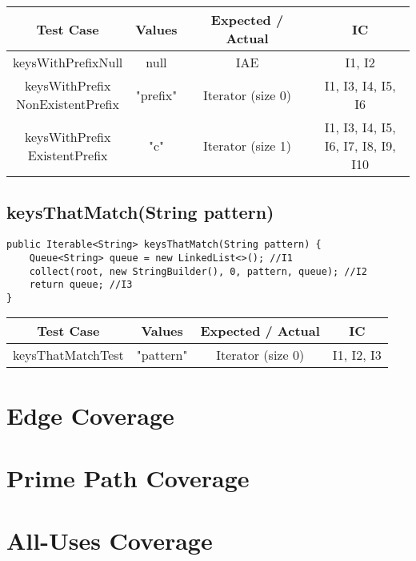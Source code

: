 \documentclass[12pt]{article}
\begin{document}
\begin{table}[htb]
\centering
\begin{tabular}{| c | c | c | c |} 
 \hline
 Test Case & Values & Expected / Actual & IC\\ \hline
 keysWithPrefixNull & null & IAE & I1, I2 \\ \hline
 \makecell{keysWithPrefix\\NonExistentPrefix} & "prefix" & Iterator (size 0) & I1, I3, I4, I5, I6 \\ \hline
 \makecell{keysWithPrefix\\ExistentPrefix} & "c" & Iterator (size 1) & \makecell{I1, I3, I4, I5, \\ I6, I7, I8, I9, I10} \\ \hline
\end{tabular}
\end{table}


\subsection{keysThatMatch(String pattern)}
\begin{lstlisting}
public Iterable<String> keysThatMatch(String pattern) {
    Queue<String> queue = new LinkedList<>(); //I1
    collect(root, new StringBuilder(), 0, pattern, queue); //I2
    return queue; //I3
}
\end{lstlisting}

\begin{table}[htb]
\centering
\begin{tabular}{| c | c | c | c |} 
 \hline
 Test Case & Values & Expected / Actual & IC\\ \hline
 keysThatMatchTest & "pattern" & Iterator (size 0) & I1, I2, I3 \\ \hline
\end{tabular}
\end{table}

\section{Edge Coverage}


\section{Prime Path Coverage}



\section{All-Uses Coverage }
\end{document}
